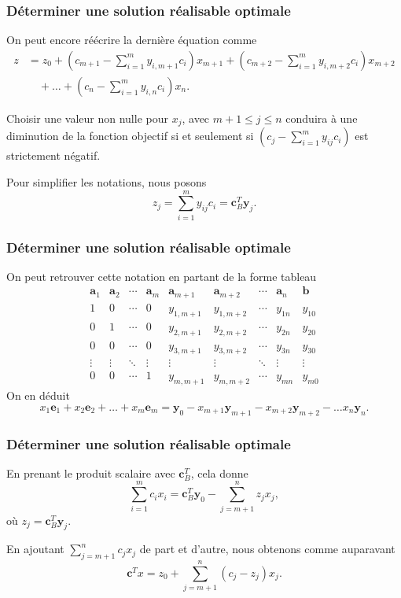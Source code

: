 \documentclass[t,usepdftitle=false]{beamer}
\def\ba{\boldsymbol{a}}
\def\bb{\boldsymbol{b}}
\def\bc{\boldsymbol{c}}
\def\be{\boldsymbol{e}}
\def\by{\boldsymbol{y}}
\begin{document}
\begin{frame}
\frametitle{Déterminer une solution réalisable optimale}

On peut encore réécrire la dernière équation comme
\begin{align*}
z &= z_0 + \left(c_{m+1} - \sum_{i=1}^m y_{i,m+1}c_i\right)x_{m+1}
+ \left(c_{m+2} - \sum_{i=1}^m y_{i,m+2}c_i\right)x_{m+2} \\
& \quad + \ldots
+ \left(c_{n} - \sum_{i=1}^m y_{i,n}c_i \right) x_{n}.
\end{align*}

\mbox{}

Choisir une valeur non nulle pour $x_j$, avec $m+1 \leq j \leq n$ conduira à une diminution de la fonction objectif si et seulement si $\left(c_j - \sum_{i=1}^m y_{ij}c_i\right)$ est strictement négatif.

\mbox{}

Pour simplifier les notations, nous posons
\[
z_j = \sum_{i=1}^m y_{ij}c_i = \bc_B^T \by_j.
\]

\end{frame}

\begin{frame}
\frametitle{Déterminer une solution réalisable optimale}

On peut retrouver cette notation en partant de la forme tableau
\[
\begin{matrix}
\ba_1 & \ba_2 & \cdots & \ba_m & \ba_{m+1} &
\ba_{m+2} & \cdots & \ba_n & \bb \\
1 & 0 & \cdots & 0 & y_{1,m+1} & y_{1,m+2} & \cdots & y_{1n} & y_{10} \\
0 & 1 & \cdots & 0 & y_{2,m+1} & y_{2,m+2} & \cdots & y_{2n} & y_{20} \\
0 & 0 & \cdots & 0 & y_{3,m+1} & y_{3,m+2} & \cdots & y_{3n} & y_{30} \\
\vdots & \vdots & \ddots & \vdots & \vdots & \vdots & \ddots & \vdots & \vdots \\
0 & 0 & \cdots & 1 & y_{m,m+1} & y_{m,m+2} & \cdots & y_{mn} & y_{m0}
\end{matrix}
\]
On en déduit
\[
x_1 \be_1 + x_2 \be_2 + \ldots + x_m\be_m
= \by_0 - x_{m+1}\by_{m+1} - x_{m+2} \by_{m+2} - \ldots x_n \by_n.
\]

\end{frame}

\begin{frame}
\frametitle{Déterminer une solution réalisable optimale}

En prenant le produit scalaire avec $\bc_B^T$, cela donne
\[
\sum_{i = 1}^m c_i x_i = \bc_B^T \by_0 - \sum_{j = m+1}^n z_j x_j,
\]
où $z_j = \bc_B^T \by_j$.

\mbox{}

En ajoutant $\sum_{j = {m+1}}^{n} c_jx_j$ de part et d'autre, nous obtenons comme auparavant
\[
\bc^Tx = z_0 + \sum_{j = m+1}^{n} (c_j - z_j) x_j.
\]

\end{frame}
\end{document}

